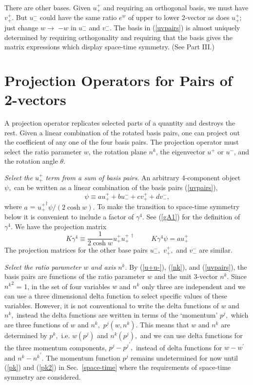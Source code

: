 \documentclass[a4paper,12pt]{article}
\begin{document}
	There are other bases. Given $u_{+}^{+}$ and requiring an orthogonal basis, we must have $v_{+}^{+}.$ But $u_{-}^{-}$ could have the same ratio $e^{w}$ of upper to lower 2-vector as does $u^{+}_{+};$ just change $w \rightarrow$ $-w$ in $u_{-}^{-}$ and $v_{-}^{-}.$ The basis in (\ref{uvpairs}) is almost uniquely determined by requiring orthogonality and requiring that the basis gives the matrix expressions which display space-time symmetry. (See Part III.)

\section{Projection Operators for Pairs of 2-vectors} \label{proj} %

	A projection operator replicates selected parts of a quantity and destroys the rest. Given a linear combination of the rotated basis pairs, one can project out the coefficient of any one of the four basis pairs. The projection operator must select the ratio parameter $w$, the rotation plane $n^{k}$, the eigenvector $u^{+}$ or $u^{-}$, and the rotation angle $\theta.$  

	{\textit{Select the $u_{+}^{+}$ term from a sum of basis pairs}}. An arbitrary 4-component object $\psi,$ can be written as a linear combination of the basis pairs (\ref{uvpairs}),
\begin{equation} \label{psi,uv}
 \psi \equiv a  u_{+}^{+} + b u_{-}^{-} + c  v_{+}^{+} + d v_{-}^{-},
\end{equation}
where $a$ = ${u_{+}^{+}}^{\dagger} \psi/(2 \cosh{w}) .$ To make the transition to space-time symmetry below it is convenient to include a factor of $ \gamma^{4}.$ See (\ref{gA1}) for the definition of $\gamma^{4}.$ We have the projection matrix  
\begin{equation} \label{K,u++}
K \gamma^{4} \equiv \frac{1}{2 \cosh{w}} u_{+}^{+} u_{+}^{+ \: \dagger}  \hspace{1cm} K \gamma^{4} \psi = a  u_{+}^{+}
\end{equation}
The projection matrices for the other base pairs $u_{-}^{-},$ $v_{+}^{+},$ and $v_{-}^{-}$ are similar.
 
	{\textit{Select the ratio parameter $w$ and axis $n^{k}$}}. By (\ref{u+u-}), (\ref{nk}), and (\ref{uvpairs}), the basis pairs are functions of the ratio parameter $w$ and the unit 3-vector $n^{k}.$ Since ${n^{k}}^{2}$ = 1, in the set of four variables $w$ and $n^{k}$ only three are independent and we can use a three dimensional delta function to select specific values of these variables. However, it is not conventional to write the delta functions of $w$ and $n^{k},$ instead the delta functions are written in terms of the `momentum' $p^{j},$ which are three functions of $w$ and $n^{k},$ $p^{j}(w,n^{k}).$ This means that $w $ and $n^{k}$ are determined by $p^{k},$ i.e. $w(p^{j})$ and $n^{k}(p^{j}),$ and we can use delta functions for the three momentum components, $p^{j}-{p^{j}}^{\prime},$ instead of delta functions for $w - w^{\prime}$ and $n^{k} - {n^{k}}^{\prime}.$ The momentum function $p^{j}$ remains undetermined for now until (\ref{pk}) and (\ref{pk2}) in Sec.~\ref{space-time} where the requirements of space-time symmetry are considered.
\end{document}
